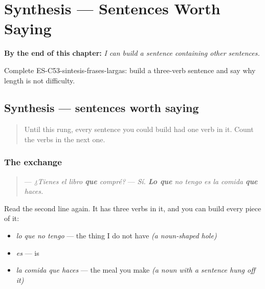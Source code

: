 
\chapter{Synthesis --- Sentences Worth Saying}
\label{ch:synthesis-relative}

\begin{chapteropening}
\textbf{By the end of this chapter:} \emph{I can build a sentence containing other sentences.}

Complete ES-C53-sintesis-frases-largas: build a three-verb sentence and say why length is not difficulty.
\end{chapteropening}

\section[Practice]{Synthesis — sentences worth saying}

\label{lesson:ES-C53-sintesis-frases-largas}



\begin{quote}
Until this rung, every sentence you could build had one verb in it. Count the verbs in the next one.
\end{quote}

\subsection*{The exchange}
\begin{quote}
— \emph{¿Tienes el libro \textbf{que} compré?} — \emph{Sí. \textbf{Lo que} no tengo es la comida \textbf{que} haces.}
\end{quote}

Read the second line again. It has three verbs in it, and you can build every piece of it:

\begin{itemize}
\raggedright
  \item \emph{lo que no tengo} — the thing I do not have \emph{(a noun-shaped hole)}
  \item \emph{es} — is
  \item \emph{la comida que haces} — the meal you make \emph{(a noun with a sentence hung off it)}
\end{itemize}


